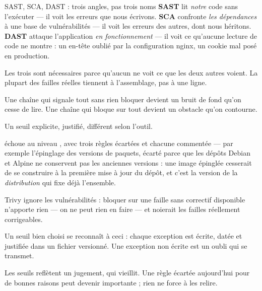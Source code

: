 \begin{notion}{SAST, SCA, DAST : trois angles, pas trois noms}
\textbf{SAST} lit \emph{notre} code sans l'exécuter --- il voit les erreurs que
nous écrivons. \textbf{SCA} confronte \emph{les dépendances} à une base de
vulnérabilités --- il voit les erreurs des autres, dont nous héritons.
\textbf{DAST} attaque l'application \emph{en fonctionnement} --- il voit ce
qu'aucune lecture de code ne montre : un en-tête oublié par la configuration
nginx, un cookie mal posé en production.

Les trois sont nécessaires parce qu'aucun ne voit ce que les deux autres
voient. La plupart des failles réelles tiennent à l'assemblage, pas à une
ligne.
\end{notion}


\menace
Une chaîne qui signale tout sans rien bloquer devient un bruit de fond qu'on
cesse de lire. Une chaîne qui bloque sur tout devient un obstacle qu'on
contourne.

\parade
Un seuil explicite, justifié, différent selon l'outil.

\danslecode
{} échoue au niveau , avec trois règles écartées et
chacune commentée --- par exemple l'épinglage des versions de paquets, écarté
parce que les dépôts Debian et Alpine ne conservent pas les anciennes versions :
une image épinglée cesserait de se construire à la première mise à jour du
dépôt, et c'est la version de la \emph{distribution} qui fixe déjà l'ensemble.

Trivy ignore les vulnérabilités  : bloquer sur une faille
sans correctif disponible n'apporte rien --- on ne peut rien en faire --- et
noierait les failles réellement corrigeables.

\begin{retenir}
Un seuil bien choisi se reconnaît à ceci : chaque exception est écrite, datée
et justifiée dans un fichier versionné. Une exception non écrite est un oubli
qui se transmet.
\end{retenir}

\limite
Les seuils reflètent un jugement, qui vieillit. Une règle écartée aujourd'hui
pour de bonnes raisons peut devenir importante ; rien ne force à les relire.


